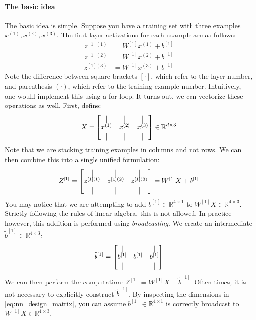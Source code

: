 \paragraph{The basic idea} The basic idea is simple. Suppose you have a training
set with three examples $x^{(1)} ,x^{(2)} ,x^{(3)}$. The first-layer activations for each
example are as follows:
\begin{align*}
    z^{[1](1)} &= W^{[1]} x^{(1)} + b^{[1]}\\
    z^{[1](2)} &= W^{[1]} x^{(2)} + b^{[1]}\\
    z^{[1](3)} &= W^{[1]} x^{(3)} + b^{[1]}
\end{align*}
Note the difference between square brackets $[\cdot]$, which refer to the layer
number, and parenthesis $(\cdot)$, which refer to the training example number.
Intuitively, one would implement this using a for loop. It turns out, we can
vectorize these operations as well. First, define:
\begin{equation}\label{eq:nn_design_matrix}
    X =
    \begin{bmatrix}
        \vertbar & \vertbar & \vertbar\\
        x^{(1)} & x^{(2)} & x^{(3)}\\
        \vertbar & \vertbar & \vertbar
    \end{bmatrix} \in \mathbb{R}^{d \times 3}
\end{equation}
Note that we are stacking training examples in columns and not rows. We
can then combine this into a single unified formulation:
\begin{equation}
    Z^{[1]} = \begin{bmatrix}
        \vertbar & \vertbar & \vertbar\\
        z^{[1](1)} & z^{[1](2)} & z^{[1](3)}\\
        \vertbar & \vertbar & \vertbar
    \end{bmatrix} = W^{[1]} X + b^{[1]}
\end{equation}
You may notice that we are attempting to add $b^{[1]} \in \mathbb{R}^{4 \times 1}$ to $W^{[1]} X \in
\mathbb{R}^{4 \times 3}$. Strictly following the rules of linear algebra, this is not allowed. In
practice however, this addition is performed using \textit{broadcasting}. We create
an intermediate $\tilde{b}^{[1]} \in \mathbb{R}^{4 \times 3}$:
\begin{equation}
    \tilde{b}^{[1]} =
    \begin{bmatrix}
        \vertbar & \vertbar & \vertbar\\
        b^{[1]} & b^{[1]} & b^{[1]}\\
        \vertbar & \vertbar & \vertbar
    \end{bmatrix}
\end{equation}
We can then perform the computation: $Z^{[1]} = W^{[1]} X + \tilde{b}^{[1]}$. Often times, it
is not necessary to explicitly construct
$\tilde{b}^{[1]}$. By inspecting the dimensions in \cref{eq:nn_design_matrix},
you can assume $b^{[1]} \in \mathbb{R}^{4 \times 1}$ is correctly broadcast to $W^{[1]} X \in \mathbb{R}^{4 \times 3}$.

